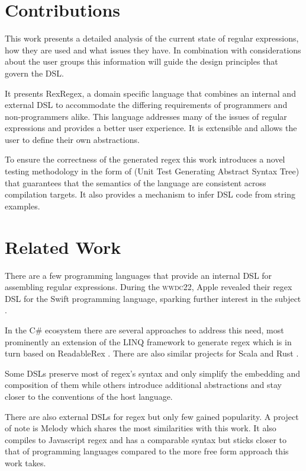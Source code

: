 \section{Contributions}

This work presents a detailed analysis of the current state of regular expressions, how they are used and what issues they have. In combination with considerations about the user groups this information will guide the design principles that govern the DSL. 

It presents RexRegex, a domain specific language that combines an internal and external DSL to accommodate the differing requirements of programmers and non-programmers alike. This language addresses many of the issues of regular expressions and provides a better user experience. It is extensible and allows the user to define their own abstractions.

To ensure the correctness of the generated regex this work introduces a novel testing methodology in the form of \utgast{} (Unit Test Generating Abstract Syntax Tree) that guarantees that the semantics of the language are consistent across compilation targets. It also provides a mechanism to infer DSL code from string examples.

\section{Related Work} \label{sec:relatedWork}

There are a few programming languages that provide an internal DSL for assembling regular expressions. During the \textsc{wwdc22}, Apple revealed their regex DSL for the Swift programming language, sparking further interest in the subject \cite{RegexDslSwift}.

In the C\# ecosystem there are several approaches to address this need, most prominently an extension of the LINQ framework \cite{linq} to generate regex \cite{RegexDslLinq} which is in turn based on ReadableRex \cite{RegexDslReadableRex}. There are also similar projects for Scala \cite{RegexDslRel} and Rust \cite{RegexDslPomsky}. 

Some DSLs preserve most of regex's syntax and only simplify the embedding and composition of them while others introduce additional abstractions and stay closer to the conventions of the host language.

There are also external DSLs for regex but only few gained popularity. A project of note is Melody \cite{RegexDslMelody} which shares the most similarities with this work. It also compiles to Javascript regex and has a comparable syntax but sticks closer to that of programming languages compared to the more free form approach this work takes.

